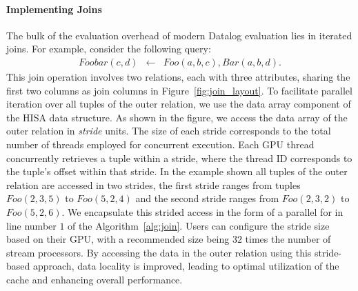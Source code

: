 \documentclass[nonacm,sigplan]{acmart}
\newcommand{\tool}{\textsc{GPUlog}}
\begin{document}
\paragraph*{Implementing Joins}
\label{sec:join-impl}
The bulk of the evaluation overhead of modern Datalog evaluation lies in iterated joins. For example, consider the following query:
\[
\begin{array}{lcl}
    \textit{Foobar}(c,d)  & \leftarrow &  \textit{Foo}(a, b, c), \textit{Bar}(a, b, d). 
\end{array}
\]
This join operation involves two relations, each with three attributes, sharing the first two columns as join columns in Figure~\ref{fig:join_layout}.
To facilitate parallel iteration over all tuples of the outer relation, we use the data array component of the HISA data structure.
As shown in the figure, we access the data array of the outer relation in \emph{stride} units. The size of each stride corresponds to the total number of threads employed for concurrent execution. 
Each GPU thread concurrently retrieves a tuple within a stride, where the thread ID corresponds to the tuple's offset within that stride.
In the example shown all tuples of the outer relation are accessed in two strides, the first stride ranges from tuples $\textit{Foo}(2,3,5)$ to $\textit{Foo}(5,2,4)$ and the second stride ranges from $\textit{Foo}(2,3,2)$ to $\textit{Foo}(5,2,6)$. We encapsulate this strided access in the form of a parallel for in line number $1$ of the Algorithm~\ref{alg:join}.
Users can configure the stride size based on their GPU, with a recommended size being $32$ times the number of stream processors.
By accessing the data in the outer relation using this stride-based approach, data locality is improved, leading to optimal utilization of the cache and enhancing overall performance.
\end{document}
